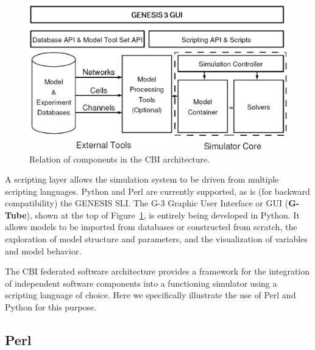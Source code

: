 \documentclass[12pt]{article}
\begin{document}
\begin{figure}[ht]
  \centering
    \includegraphics[scale=0.4]{figures/G3arch.eps}
  \caption{Relation of components in the CBI architecture.}
  \label{fig:cbi-arch}
\end{figure}

A scripting layer allows the simulation system to be driven from
multiple scripting languages. Python and Perl are currently supported,
as is (for backward compatibility) the GENESIS SLI. The G-3 Graphic
User Interface or GUI ({\bf G-Tube}), shown at the top of
Figure~\ref{fig:cbi-arch}, is entirely being developed in Python.  It
allows models to be imported from databases or constructed from
scratch, the exploration of model structure and parameters, and the
visualization of variables and model behavior.

The CBI federated software architecture provides a framework for the
integration of independent software components into a functioning
simulator using a scripting language of choice.
Here we specifically illustrate the use of Perl and Python for this
purpose.

\subsection{Perl}
\end{document}
